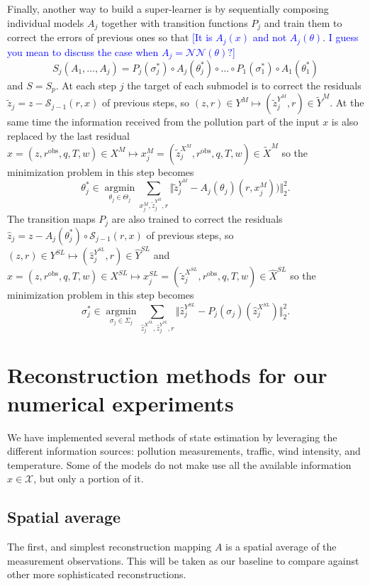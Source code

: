 \documentclass[11pt,a4paper,twoside]{article}
\theoremstyle{definition}
\numberwithin{equation}{section}
\newcommand{\cN}{\ensuremath{\mathcal{N}}}
\newcommand{\cS}{\ensuremath{\mathcal{S}}}
\newcommand{\cX}{\ensuremath{\mathcal{X}}}
\newcommand{\<}{\langle}
\renewcommand{\>}{\rangle}
\newcommand{\argmin}{\operatorname{argmin}}
\newcommand{\obs}{\ensuremath{\text{obs}}}
\newcommand{\asmodif}[2]{{\color{teal} #1} {\sout{#2}}}
\newcommand{\om}[1]{\textcolor{blue}{#1}}
\begin{document}
\asmodif{
Finally, another way to build a super-learner is by sequentially composing individual models $A_j$ together with transition functions $P_j$ and train them to correct the errors of previous ones so that \om{[It is $A_j(x)$ and not $A_j(\theta)$. I guess you mean to discuss the case when $A_j = \cN\cN(\theta)?$]}
$$
S_j(A_1, \dots, A_j) = P_j(\sigma_j^*) \circ A_j(\theta_j^*) \circ \dots \circ P_1(\sigma_1^*) \circ A_1(\theta_1^*)
$$
and $S=S_p$. At each step $j$ the target of each submodel is to correct the residuals $\tilde z_j=z - \cS_{j-1}(r, x)$ of previous steps, so $(z, r)\in Y^{M} \mapsto (\tilde z_j^{Y^{M}}, r) \in \tilde Y^{M}$. At the same time the information received from the pollution part of the input $x$ is also replaced by the last residual $x = (z, r^\obs, q, T, w) \in X^{M} \mapsto x_j^M = (\tilde z_j^{X^{M}}, r^\obs, q, T, w) \in \tilde X^{M}$ so the minimization problem in this step becomes
$$
\theta_j^* \in \underset{\theta_j \in \Theta_j}{\argmin}
\sum_{x_j^M, \tilde z_j^{Y^{M}}, r}
\Vert \tilde z_j^{Y^{M}} - A_j(\theta_j)(r, x_j^M)) \Vert^2_2.
$$
The transition maps $P_j$ are also trained to correct the residuals $\hat z_j=z - A_j(\theta_j^*)\circ\cS_{j-1}(r, x)$ of previous steps, so $(z, r)\in Y^{SL} \mapsto (\hat z_j^{Y^{SL}}, r) \in \hat Y^{SL}$ and $x = (z, r^\obs, q, T, w) \in X^{SL} \mapsto x_j^{SL} = (\tilde z_j^{X^{SL}}, r^\obs, q, T, w)  \in \hat X^{SL}$ so the minimization problem in this step becomes
$$
\sigma_j^* \in \underset{\sigma_j \in \Sigma_j}{\argmin}
\sum_{\hat z_j^{X^{SL}}, \hat z_j^{Y^{SL}}, r}
\Vert \hat z_j^{Y^{SL}} - P_j(\sigma_j)(\hat z_j^{X^{SL}}) \Vert^2_2.
$$
}{}


\section{Reconstruction methods for our numerical experiments}
\label{sec:concrete-methods}
We have implemented several methods of state estimation by leveraging the different information sources: pollution measurements, traffic, wind intensity, and temperature. Some of the models do not make use all the available information $x\in \cX$, but only a portion of it. 

\subsection{Spatial average}
\label{sec:snapshotmean}
The first, and simplest reconstruction mapping $A$ is a spatial average of the measurement observations. This will be taken as our baseline to compare against other more sophisticated reconstructions.
\end{document}
